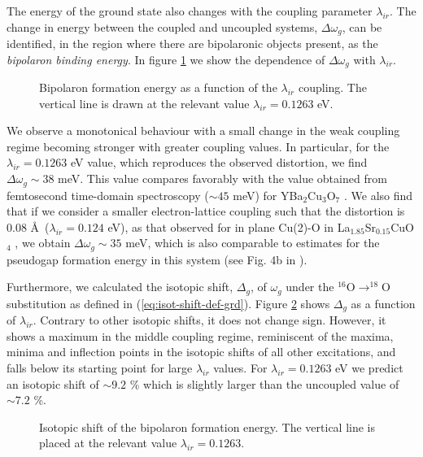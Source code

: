 The energy of the ground state also changes with the coupling parameter $\lambda_{ir}$.
The change in energy between the coupled and uncoupled systems, $\Delta\omega_{g}$, can be identified, in the region where there are bipolaronic objects present, as the \textit{bipolaron binding energy}.
In figure \ref{fig:polaronFormation} we show the dependence of $\Delta\omega_{g}$ with $\lambda_{ir}$.

\begin{figure}[ht]
  \centering
  
  \caption[Bipolaron formation energy as a function of the $\lambda_{ir}$ coupling. ]
  {Bipolaron formation energy as a function of the $\lambda_{ir}$ coupling. The vertical line is drawn at the relevant value $\lambda_{ir}=0.1263$ eV.}
  \label{fig:polaronFormation}
\end{figure}

We observe a monotonical behaviour with a small change in the weak coupling regime becoming stronger with greater coupling values.
In particular, for the $\lambda_{ir}=0.1263$ eV value, which reproduces the observed distortion, we find $\Delta\omega_{g} \sim 38$ meV.
This value compares favorably with the value obtained from femtosecond time-domain spectroscopy ($\sim 45$ meV) for YBa$_2$Cu$_3$O$_7$ \cite{Demsar1999}. 
We also find that if we consider a smaller electron-lattice coupling such that the distortion is 0.08 \AA\ ($\lambda_{ir}=0.124$ eV), as that observed for in plane Cu(2)-O in La$_{1.85}$Sr$_{0.15}$CuO$_4$ \cite{Bianconi1996}, we obtain $\Delta\omega_{g} \sim 35$ meV, which is also comparable to estimates for the pseudogap formation energy in this system (see Fig. 4b in \cite{Kusar2005}).

Furthermore, we calculated the isotopic shift, $\Delta_g$, of $\omega_g$ under the $^{16}$O$\rightarrow ^{18}$O substitution as defined in (\ref{eq:isot-shift-def-grd}).
Figure \ref{fig:isotPolaronFormation} shows $\Delta_g$ as a function of $\lambda_{ir}$.
Contrary to other isotopic shifts, it does not change sign.
However, it shows a maximum in the middle coupling regime, reminiscent of the maxima, minima and inflection points in the isotopic shifts of all other excitations, and falls below its starting point for large $\lambda_{ir}$ values.
For $\lambda_{ir}=0.1263$ eV we predict an isotopic shift of $\sim 9.2$ \% which is slightly larger than the uncoupled value of $\sim 7.2$ \%.

\begin{figure}[ht]
  \centering
  
  \caption[Isotopic shift of the bipolaron formation energy.]
  {Isotopic shift of the bipolaron formation energy. The vertical line is placed at the relevant value $\lambda_{ir}=0.1263$.}
  \label{fig:isotPolaronFormation}
\end{figure}



